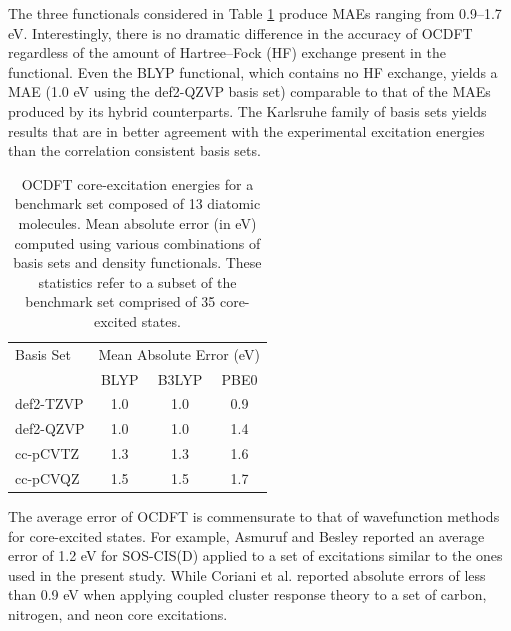 \documentclass[12pt]{article}
\begin{document}
The three functionals considered in Table \ref{table:OverallPerformance} produce MAEs ranging from 0.9--1.7 eV. Interestingly, there is no dramatic difference in the accuracy of OCDFT regardless of the amount of Hartree--Fock (HF) exchange present in the functional.  Even the BLYP functional, which contains no HF exchange, yields a MAE (1.0 eV using the def2-QZVP basis set) comparable to that of the MAEs produced by its hybrid counterparts. 
The Karlsruhe family of basis sets yields results that are in better agreement with the experimental excitation energies than the correlation consistent basis sets.
\begin{table}[!ht]
\small
\caption{OCDFT core-excitation energies for a benchmark set composed of 13 diatomic molecules.  Mean absolute error (in eV) computed using various combinations of basis sets and density functionals. These statistics refer to a subset of the benchmark set comprised of 35 core-excited states.}
\centering
    \begin{tabular}{lccc}
    \hline
    \hline
Basis Set & \multicolumn{3}{c}{Mean Absolute Error (eV)}  \\
& BLYP & B3LYP & PBE0\\
\hline
def2-TZVP & 1.0 & 1.0 & 0.9 \\
def2-QZVP & 1.0 & 1.0 & 1.4 \\
cc-pCVTZ & 1.3 & 1.3 & 1.6 \\
cc-pCVQZ & 1.5 & 1.5 & 1.7 \\
\hline
\hline
\end{tabular}
\label{table:OverallPerformance}
\end{table}
The average error of OCDFT is commensurate to that of wavefunction methods for core-excited states. For example, Asmuruf and Besley\cite{asmuruf_calculation_2008} reported an average error of 1.2 eV for SOS-CIS(D) applied to a set of excitations similar to the ones used in the present study. While Coriani et al.\cite{coriani_coupled-cluster_2012} reported absolute errors of less than 0.9 eV when applying coupled cluster response theory to a set of carbon, nitrogen, and neon core excitations. 
\end{document}
